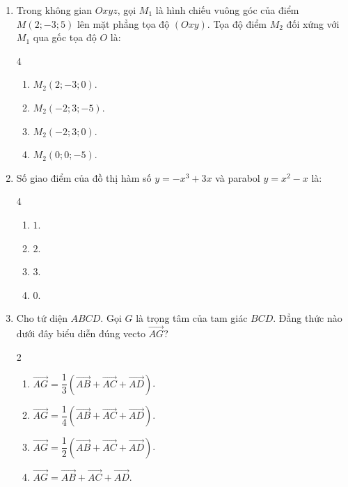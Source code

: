 \documentclass[12pt]{article}
\begin{document}
\begin{enumerate}[label=\textbf{Câu \arabic*.}, leftmargin=*]
		\item Trong không gian $Oxyz$, gọi $M_1$ là hình chiếu vuông góc của điểm $M(2; -3; 5)$ lên mặt phẳng tọa độ $(Oxy)$. Tọa độ điểm $M_2$ đối xứng với $M_1$ qua gốc tọa độ $O$ là:
		\begin{multicols}{4}
			\begin{enumerate}[label=\Alph*.]
				\item $M_2(2; -3; 0)$.
				\item $M_2(-2; 3; -5)$.
				\item $M_2(-2; 3; 0)$.
				\item $M_2(0; 0; -5)$.
			\end{enumerate}
		\end{multicols}
		
		\item Số giao điểm của đồ thị hàm số $y = -x^3 + 3x$ và parabol $y = x^2 - x$ là:
		\begin{multicols}{4}
			\begin{enumerate}[label=\Alph*.]
				\item $1$.
				\item $2$.
				\item $3$.
				\item $0$.
			\end{enumerate}
		\end{multicols}
		
		\item Cho tứ diện $ABCD$. Gọi $G$ là trọng tâm của tam giác $BCD$. Đẳng thức nào dưới đây biểu diễn đúng vecto $\overrightarrow{AG}$?
		\begin{multicols}{2}
			\begin{enumerate}[label=\Alph*.]
				\item $\overrightarrow{AG} = \dfrac{1}{3} \left( \overrightarrow{AB} + \overrightarrow{AC} + \overrightarrow{AD} \right)$.
				\item $\overrightarrow{AG} = \dfrac{1}{4} \left( \overrightarrow{AB} + \overrightarrow{AC} + \overrightarrow{AD} \right)$.
				\item $\overrightarrow{AG} = \dfrac{1}{2} \left( \overrightarrow{AB} + \overrightarrow{AC} + \overrightarrow{AD} \right)$.
				\item $\overrightarrow{AG} = \overrightarrow{AB} + \overrightarrow{AC} + \overrightarrow{AD}$.
			\end{enumerate}
		\end{multicols}
		

\end{enumerate}
\end{document}
